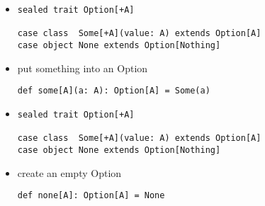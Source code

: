 \documentclass[include/preamble.tex]{subfiles}
\begin{document}
\begin{frame}[fragile]
  \begin{center}
    \begin{itemize}
    \item[]
      \begin{lstlisting}[style=scala]
sealed trait Option[+A]

case class  Some[+A](value: A) extends Option[A]
case object None extends Option[Nothing]
      \end{lstlisting}
      \vspace{1em}
      \pause
    \item
      put something into an Option
      \newline
      \newline
      \pause
      \pause
      \vspace{1em}
      \begin{lstlisting}[style=scala]
def some[A](a: A): Option[A] = Some(a)
      \end{lstlisting}
    \end{itemize}
  \end{center}
\end{frame}

\begin{frame}[fragile]
  \begin{center}
    \begin{itemize}
    \item[]
      \begin{lstlisting}[style=scala]
sealed trait Option[+A]

case class  Some[+A](value: A) extends Option[A]
case object None extends Option[Nothing]
      \end{lstlisting}
      \vspace{1em}
      \pause
    \item
      create an empty Option
      \newline
      \pause
      \begin{lstlisting}[style=scala]
def none[A]: Option[A] = None
      \end{lstlisting}
      \pause
      \vspace{1em}
    \end{itemize}
  \end{center}
\end{frame}
\end{document}
